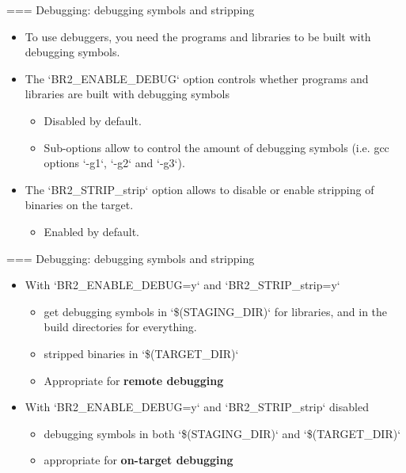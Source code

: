 === {Debugging: debugging symbols and stripping}
  \begin{itemize}
  \item To use debuggers, you need the programs and libraries to be
    built with debugging symbols.
  \item The `BR2_ENABLE_DEBUG` option controls whether programs
    and libraries are built with debugging symbols
    \begin{itemize}
    \item Disabled by default.
    \item Sub-options allow to control the amount of debugging symbols
      (i.e. gcc options `-g1`, `-g2` and `-g3`).
    \end{itemize}
  \item The `BR2_STRIP_strip` option allows to disable or enable
    stripping of binaries on the target.
    \begin{itemize}
    \item Enabled by default.
    \end{itemize}
  \end{itemize}


=== {Debugging: debugging symbols and stripping}
  \begin{itemize}
  \item With `BR2_ENABLE_DEBUG=y` and `BR2_STRIP_strip=y`
    \begin{itemize}
    \item get debugging symbols in `\$(STAGING_DIR)` for
      libraries, and in the build directories for everything.
    \item stripped binaries in `\$(TARGET_DIR)`
    \item Appropriate for {\bf remote debugging}
    \end{itemize}
  \item With `BR2_ENABLE_DEBUG=y` and `BR2_STRIP_strip`
    disabled
    \begin{itemize}
    \item debugging symbols in both `\$(STAGING_DIR)` and
      `\$(TARGET_DIR)`
    \item appropriate for {\bf on-target debugging}
    \end{itemize}
  \end{itemize}


